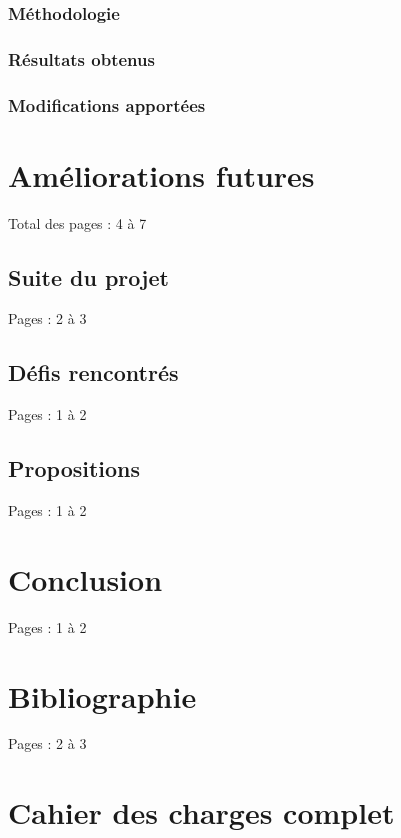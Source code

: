 \documentclass{eplmastersthesis_FR}
\begin{document}
			\subsection*{Méthodologie}
			\subsection*{Résultats obtenus}
			\subsection*{Modifications apportées}

	\chapter{Améliorations futures}

		Total des pages : 4 à 7

		\section{Suite du projet}

			Pages : 2 à 3

		\section{Défis rencontrés}

			Pages : 1 à 2

		\section{Propositions}

			Pages : 1 à 2

	\chapter{Conclusion}

		Pages : 1 à 2

	\chapter*{Bibliographie}

	{}
	

		Pages : 2 à 3

	\appendix

	\chapter{Cahier des charges complet}
\end{document}
